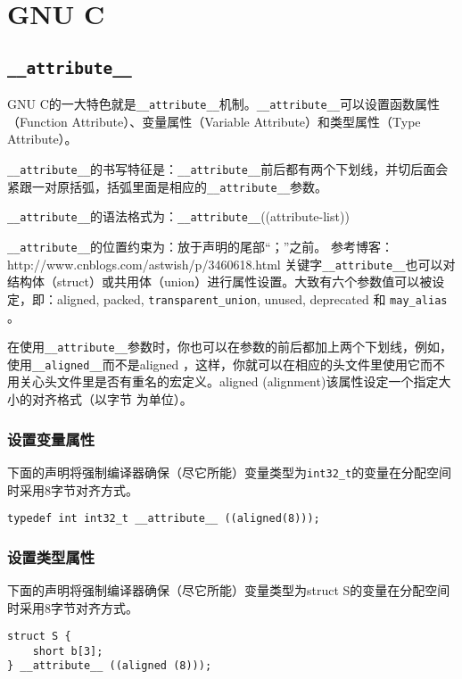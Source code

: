	\section{GNU C}
		\subsection{\texttt{__attribute__}}
			GNU C的一大特色就是\texttt{__attribute__}机制。\texttt{__attribute__}可以设置函数属性（Function Attribute）、变量属性（Variable Attribute）和类型属性（Type Attribute）。

			\texttt{__attribute__}的书写特征是：\texttt{__attribute__}前后都有两个下划线，并切后面会紧跟一对原括弧，括弧里面是相应的\texttt{__attribute__}参数。

			\texttt{__attribute__}的语法格式为：\texttt{__attribute__}((attribute-list))

			\texttt{__attribute__}的位置约束为：放于声明的尾部“；”之前。
			参考博客：http://www.cnblogs.com/astwish/p/3460618.html
			关键字\texttt{__attribute__}也可以对结构体（struct）或共用体（union）进行属性设置。大致有六个参数值可以被设定，即：aligned, packed, \texttt{transparent_union}, unused, deprecated 和 \texttt{may_alias} 。

			在使用\texttt{__attribute__}参数时，你也可以在参数的前后都加上两个下划线，例如，使用\texttt{__aligned__}而不是aligned ，这样，你就可以在相应的头文件里使用它而不用关心头文件里是否有重名的宏定义。aligned (alignment)该属性设定一个指定大小的对齐格式（以字节 为单位）。		

			\subsubsection{设置变量属性}
				下面的声明将强制编译器确保（尽它所能）变量类型为\texttt{int32_t}的变量在分配空间时采用8字节对齐方式。

\begin{verbatim}
typedef int int32_t __attribute__ ((aligned(8)));
\end{verbatim}
			\subsubsection{设置类型属性}

				下面的声明将强制编译器确保（尽它所能）变量类型为struct S的变量在分配空间时采用8字节对齐方式。				
\begin{verbatim}
struct S {
	short b[3];
} __attribute__ ((aligned (8)));
\end{verbatim}

